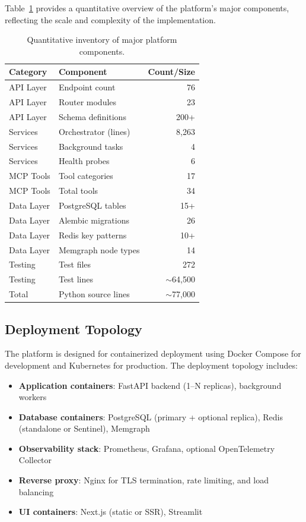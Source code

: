 Table~\ref{tab:component-inventory} provides a quantitative overview of the platform's major components, reflecting the scale and complexity of the implementation.

\begin{table}[htbp]
    \centering
    \caption{Quantitative inventory of major platform components.}
    \label{tab:component-inventory}
    \begin{tabular}{llr}
        \toprule
        \textbf{Category} & \textbf{Component} & \textbf{Count/Size} \\
        \midrule
        API Layer & Endpoint count & 76 \\
        API Layer & Router modules & 23 \\
        API Layer & Schema definitions & 200+ \\
        \midrule
        Services & Orchestrator (lines) & 8,263 \\
        Services & Background tasks & 4 \\
        Services & Health probes & 6 \\
        \midrule
        MCP Tools & Tool categories & 17 \\
        MCP Tools & Total tools & 34 \\
        \midrule
        Data Layer & PostgreSQL tables & 15+ \\
        Data Layer & Alembic migrations & 26 \\
        Data Layer & Redis key patterns & 10+ \\
        Data Layer & Memgraph node types & 14 \\
        \midrule
        Testing & Test files & 272 \\
        Testing & Test lines & $\sim$64,500 \\
        \midrule
        Total & Python source lines & $\sim$77,000 \\
        \bottomrule
    \end{tabular}
\end{table}

\subsection{Deployment Topology}

The platform is designed for containerized deployment using Docker Compose for development and Kubernetes for production. The deployment topology includes:

\begin{itemize}
    \item \textbf{Application containers}: FastAPI backend (1--N replicas), background workers
    \item \textbf{Database containers}: PostgreSQL (primary + optional replica), Redis (standalone or Sentinel), Memgraph
    \item \textbf{Observability stack}: Prometheus, Grafana, optional OpenTelemetry Collector
    \item \textbf{Reverse proxy}: Nginx for TLS termination, rate limiting, and load balancing
    \item \textbf{UI containers}: Next.js (static or SSR), Streamlit
\end{itemize}

